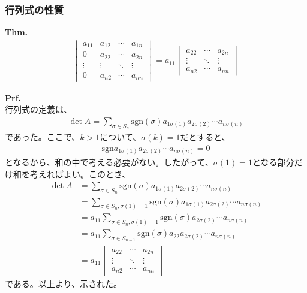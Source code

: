 \documentclass[a4paper,11pt]{jsarticle}
\numberwithin{equation}{section}
\begin{document}
\subsubsection{行列式の性質}
\begin{itembox}[l]{\textbf{Thm.}}
  \begin{align}
    \begin{vmatrix}
      a_{11} & a_{12} & \cdots & a_{1n}\\
      0 & a_{22} & \cdots & a_{2n}\\
      \vdots & \vdots & \ddots & \vdots\\
      0 & a_{n2} & \cdots & a_{nn}
    \end{vmatrix}
    =
    a_{11}
    \begin{vmatrix}
      a_{22} & \cdots & a_{2n}\\
      \vdots & \ddots & \vdots\\
      a_{n2} & \cdots & a_{nn}
    \end{vmatrix}
  \end{align}
\end{itembox}
\textbf{Prf.}\\
行列式の定義は、
\begin{align}
  \det A = \sum_{\sigma \in S_n} \text{sgn}(\sigma) a_{1\sigma(1)}a_{2\sigma(2)}\cdots a_{n\sigma(n)}
\end{align}
であった。ここで、$k > 1$について、$\sigma(k) =1$だとすると、
\begin{align}
  \text{sgn}a_{1\sigma(1)}a_{2\sigma(2)}\cdots a_{n\sigma(n)} = 0
\end{align}
となるから、和の中で考える必要がない。したがって、$\sigma(1) = 1$となる部分だけ和を考えればよい。このとき、
\begin{align}
  \det A &= \sum_{\sigma \in S_n} \text{sgn}(\sigma) a_{1\sigma(1)}a_{2\sigma(2)}\cdots a_{n\sigma(n)}\\
  &= \sum_{\sigma \in S_n, \sigma(1) = 1} \text{sgn}(\sigma) a_{1\sigma(1)}a_{2\sigma(2)}\cdots a_{n\sigma(n)}\\
  &= a_{11} \sum_{\sigma \in S_n, \sigma(1) = 1} \text{sgn}(\sigma) a_{2\sigma(2)}\cdots a_{n\sigma(n)}\\
  &= a_{11} \sum_{\sigma \in S_{n-1}} \text{sgn}(\sigma) a_{22}a_{2\sigma(2)}\cdots a_{n\sigma(n)}\\
  &= a_{11}
  \begin{vmatrix}
    a_{22} & \cdots & a_{2n}\\
    \vdots & \ddots & \vdots\\
    a_{n2} & \cdots & a_{nn}
  \end{vmatrix}
\end{align}
である。以上より、示された。\hfill\qedsymbol\\
\end{document}

